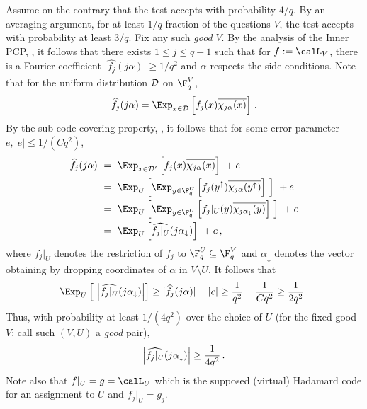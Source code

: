 Assume on the contrary that the test accepts with probability ${4}/{q}$. By an averaging argument,
for at least ${1}/{q}$ fraction of the questions $V$, the test accepts
with probability at least ${3}/{q}$. Fix any such \emph{good} $V$.
By the analysis of the Inner PCP, ,
it follows that there exists $1 \leq j\leq q-1$ such that for
$f := \calL_V$, there is a Fourier coefficient $|\widehat{f_j}(j\alpha)| \geq {1}/{q^2}$ and
$\alpha$ respects the side conditions.
Note that for the uniform distribution ${\cal D}$ on $\F_q^V$,
 $$ \widehat{f_j}(j\alpha) = \Exp_{x \in {\cal D}} \left[ f_j(x)  \overline{\chi_{j\alpha}(x)}   \right]\,. $$
By the sub-code covering property, , it follows that for some error parameter
$e, |e| \leq {1}/{(C q^2)}$,
\begin{align*}
\widehat{f_j}(j\alpha)\ &= \ \Exp_{x \in {\cal D'}} \left[  f_j(x) \overline{\chi_{j\alpha}(x)}   \right] \  + e \\
 & = \  \Exp_U \left[   \Exp_{y \in \F_q^U} \left[ f_j(y^\uparrow)
 \overline{\chi_{j\alpha}(y^\uparrow)}  \right]  \ \right] \ + e \\
 & = \  \Exp_U \left[   \Exp_{y \in \F_q^U} \left[ f_j|_U(y)
 \overline{\chi_{j\alpha_\downarrow}(y)}  \right]  \ \right] \ + e \\
 & = \  \Exp_U \left[ \widehat{f_j|_U} (j \alpha_\downarrow) \right] \ + e\,,
\end{align*}
where
$f_j|_U$ denotes the restriction of $f_j$ to $\F_q^U \subseteq \F_q^V$
and $\alpha_\downarrow$
denotes the vector obtaining by dropping coordinates of $\alpha$ in $V \setminus U$.
It follows that
 $$  \Exp_U \left[ \ \left| \widehat{f_j|_U} (j \alpha_\downarrow) \right| \right]
\geq |\widehat{f_j}(j\alpha)| - |e| \geq \frac{1}{q^2}- \frac{1}{Cq^2} \geq \frac{1}{2q^2}\,. $$
Thus, with probability at least
${1}/{(4q^2)}$ over the choice of $U$ (for the fixed good $V$; call such $(V,U)$  a \emph{good} pair),
\[
\Bigl|\widehat{f_j|_U}({j \alpha_\downarrow})\Bigr| \geq \frac{1}{4q^2}\,.
\]
Note also that
$f|_U = g = \calL_U$ which is the supposed (virtual) Hadamard code for an assignment to $U$ and
$f_j|_U = g_j$.

